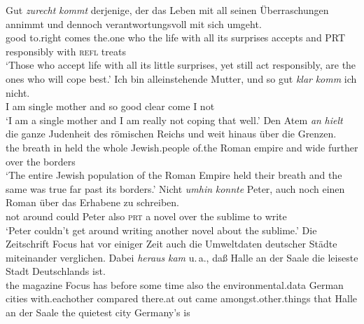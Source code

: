 \eal\label{ex-adv-particle}
\ex{}%
\gll Gut \emph{zurecht} \emph{kommt} derjenige, der das Leben mit all seinen Überraschungen annimmt und dennoch verantwortungsvoll mit sich umgeht.\label{ex-gut-zurecht}\footnotemark\\
	 good to.right comes the.one who the life with all its surprises accepts and PRT responsibly with \textsc{refl} treats\\
\glt `Those who accept life with all its little surprises, yet still act responsibly, are the ones who will cope best.'
\ex{} 
\gll Ich bin alleinstehende Mutter, und so gut \emph{klar} \emph{komm} ich nicht.\footnotemark\\
	 I   am single mother and so good clear come I not\\
\glt `I am a single mother and I am really not coping that well.'
\ex 
\gll Den Atem \emph{an} \emph{hielt} die ganze Judenheit des römischen Reichs und weit hinaus über die Grenzen.\footnotemark\\
	 the breath in held the whole Jewish.people of.the Roman empire and wide further over the borders\\
\glt `The entire Jewish population of the Roman Empire held their breath and the same was true far past its borders.'
\ex{}%
\gll Nicht \emph{umhin} \emph{konnte} Peter, auch noch  einen Roman über das Erhabene zu schrei\-ben.\label{ex-grewendorf-nicht-umhin}\footnotemark\\
	not around could Peter also \textsc{prt} a novel over the sublime to write\\
\glt `Peter couldn't get around writing another novel about the sublime.'
\ex{}%
\gll Die Zeitschrift \frq Focus\flq{} hat vor einiger Zeit auch die Umweltdaten deutscher Städte miteinander verglichen. Dabei \emph{heraus} \emph{kam} u.\,a., daß Halle an der Saale die leiseste Stadt Deutschlands ist.\footnotemark\\
	 the magazine \frq Focus\flq{} has before some time also the environmental.data German cities with.eachother compared there.at out came amongst.other.things that Halle an der Saale the quietest city Germany's is\\	 
